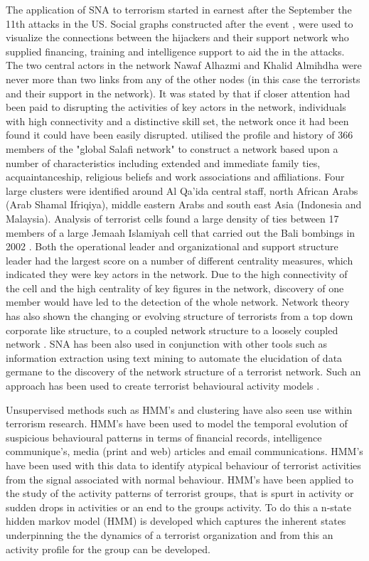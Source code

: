 The application of SNA to terrorism started in earnest after the September the 11th attacks in the US. Social graphs constructed after the event \citep{krebs2002mapping}, \citep{krebs2002uncloaking}  were used to visualize the connections between the hijackers and their support network who supplied financing, training and intelligence support to aid the in the attacks. The two central actors in the network Nawaf Alhazmi and Khalid Almihdha were never more than two links from any of the other nodes (in this case the terrorists and their support in the network). It was stated by \citep{krebs2002mapping} that if closer attention had been paid to disrupting the activities of key actors in the network, individuals with high connectivity and a distinctive skill set, the network once it had been found it could have been easily disrupted. \citep{sageman2004understanding} utilised the profile and history of 366 members of the "global Salafi network" to construct a network based upon a number of characteristics including extended and immediate family ties, acquaintanceship, religious beliefs and work associations and affiliations. Four large clusters were identified around Al Qa'ida central staff, north African Arabs (Arab Shamal Ifriqiya), middle eastern Arabs and south east Asia (Indonesia and Malaysia). Analysis of terrorist cells found a large density of ties between 17 members of a large Jemaah Islamiyah cell that carried out the Bali bombings in 2002 \citep{koschade2006social}. Both the operational leader and organizational and support structure leader had the largest score on a number of different centrality measures, which indicated they were key actors in the network. Due to the high connectivity of the cell and the high centrality of key figures in the network, discovery of one member would have led to the detection of the whole network. Network theory has also shown the changing or evolving structure of terrorists from a top down corporate like structure, to a coupled network structure to a loosely coupled network \citep{jackson2006groups}. SNA has been also used in conjunction with other tools such as information extraction using text mining to automate the elucidation of data germane to the discovery of the network structure of a terrorist network. Such an approach has been used to create terrorist behavioural activity models \citep{ball2016automating}.

Unsupervised methods such as HMM's and clustering have also seen use within terrorism research. HMM's have been used to model the temporal evolution of suspicious behavioural patterns in terms of financial records, intelligence communique's, media (print and web) articles and email communications. HMM's have been used with this data to identify atypical behaviour of terrorist activities from the signal associated with normal behaviour\citep{allanach2004detecting}. HMM's have been applied to the study of the activity patterns of terrorist groups, that is spurt in activity or sudden drops in activities or an end to the groups activity. To do this a n-state hidden markov model (HMM) is developed which captures the inherent states underpinning the the dynamics of a terrorist organization and from this an activity profile for the group can be developed.

